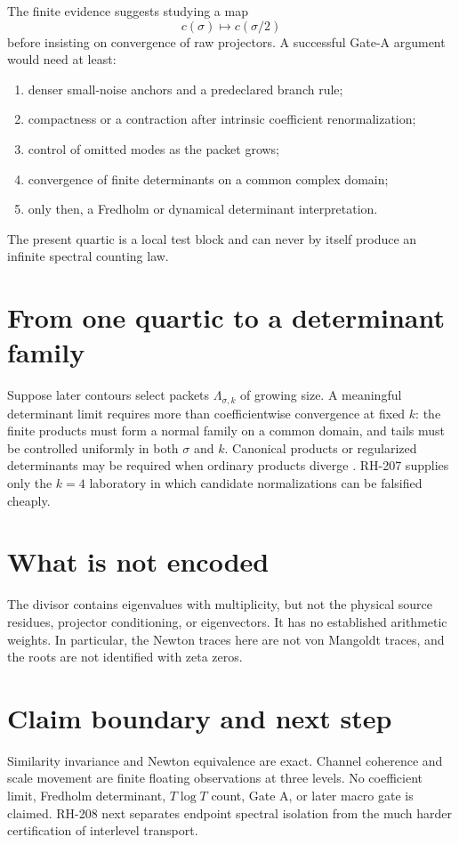 \documentclass[12pt]{article}
\theoremstyle{remark}\newtheorem{remark}[theorem]{Remark}
\begin{document}
The finite evidence suggests studying a map
\begin{equation}\label{eq:flow}
 c(\sigma)\longmapsto c(\sigma/2)
\end{equation}
before insisting on convergence of raw projectors.  A successful Gate-A
argument would need at least:
\begin{enumerate}[leftmargin=2em]
\item denser small-noise anchors and a predeclared branch rule;
\item compactness or a contraction after intrinsic coefficient
renormalization;
\item control of omitted modes as the packet grows;
\item convergence of finite determinants on a common complex domain;
\item only then, a Fredholm or dynamical determinant interpretation.
\end{enumerate}
The present quartic is a local test block and can never by itself produce an
infinite spectral counting law.

\section{From one quartic to a determinant family}

Suppose later contours select packets $\Lambda_{\sigma,k}$ of growing size.
A meaningful determinant limit requires more than coefficientwise
convergence at fixed $k$: the finite products must form a normal family on a
common domain, and tails must be controlled uniformly in both $\sigma$ and
$k$.  Canonical products or regularized determinants may be required when
ordinary products diverge \citep{Simon2005}.  RH-207 supplies only the
$k=4$ laboratory in which candidate normalizations can be falsified cheaply.

\section{What is not encoded}

The divisor contains eigenvalues with multiplicity, but not the physical
source residues, projector conditioning, or eigenvectors.  It has no
established arithmetic weights.  In particular, the Newton traces here are
not von Mangoldt traces, and the roots are not identified with zeta zeros.

\section{Claim boundary and next step}

Similarity invariance and Newton equivalence are exact.  Channel coherence
and scale movement are finite floating observations at three levels.  No
coefficient limit, Fredholm determinant, $T\log T$ count, Gate A, or later
macro gate is claimed.  RH-208 next separates endpoint spectral isolation
from the much harder certification of interlevel transport.


\end{document}

